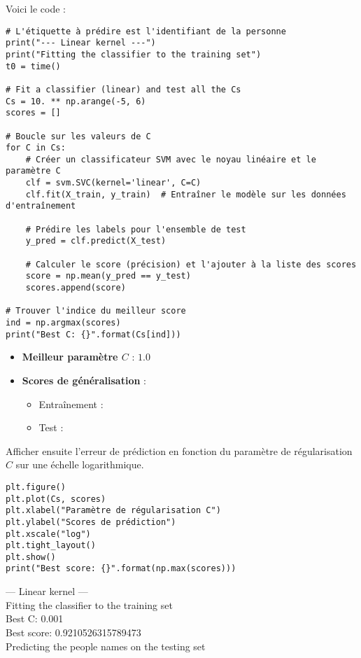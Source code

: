 \documentclass{article}
\begin{document}
\begin{itemize}
Voici le code :

\begin{verbatim}
# L'étiquette à prédire est l'identifiant de la personne 
print("--- Linear kernel ---")
print("Fitting the classifier to the training set")
t0 = time()

# Fit a classifier (linear) and test all the Cs
Cs = 10. ** np.arange(-5, 6)
scores = []

# Boucle sur les valeurs de C
for C in Cs:
    # Créer un classificateur SVM avec le noyau linéaire et le paramètre C
    clf = svm.SVC(kernel='linear', C=C)
    clf.fit(X_train, y_train)  # Entraîner le modèle sur les données d'entraînement

    # Prédire les labels pour l'ensemble de test
    y_pred = clf.predict(X_test)

    # Calculer le score (précision) et l'ajouter à la liste des scores
    score = np.mean(y_pred == y_test)
    scores.append(score)

# Trouver l'indice du meilleur score
ind = np.argmax(scores)
print("Best C: {}".format(Cs[ind]))
\end{verbatim}
\begin{itemize}
    \item \textbf{Meilleur paramètre \( C \)} : \( 1.0 \)
    \item \textbf{Scores de généralisation} :
    \begin{itemize}
        \item Entraînement : 
        \item Test : 
    \end{itemize}
\end{itemize}
Afficher ensuite l'erreur de prédiction en fonction du paramètre de 
régularisation \( C \) sur une échelle logarithmique.

\begin{verbatim}
plt.figure()
plt.plot(Cs, scores)
plt.xlabel("Paramètre de régularisation C")
plt.ylabel("Scores de prédiction")
plt.xscale("log")
plt.tight_layout()
plt.show()
print("Best score: {}".format(np.max(scores)))
\end{verbatim}
--- Linear kernel ---\\
Fitting the classifier to the training set\\
Best C: 0.001\\
Best score: 0.9210526315789473\\
Predicting the people names on the testing set\\


\end{itemize}
\end{document}
